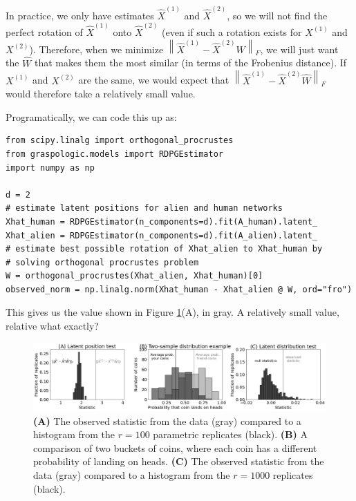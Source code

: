 In practice, we only have estimates $\hat X^{(1)}$ and $\hat X^{(2)}$, so we will not find the perfect rotation of $\hat X^{(1)}$ onto $\hat X^{(2)}$ (even if such a rotation exists for $X^{(1)}$ and $X^{(2)}$). Therefore, when we minimize $\left\|\hat X^{(1)} - \hat X^{(2)}W\right\|_F$, we will just want the $\hat W$ that makes them the most similar (in terms of the Frobenius distance). If $X^{(1)}$ and $X^{(2)}$ are the same, we would expect that $\left\|\hat X^{(1)} - \hat X^{(2)}\hat W\right\|_F$ would therefore take a relatively small value.

Programatically, we can code this up as:

\begin{lstlisting}[style=python]
from scipy.linalg import orthogonal_procrustes
from graspologic.models import RDPGEstimator
import numpy as np

d = 2
# estimate latent positions for alien and human networks
Xhat_human = RDPGEstimator(n_components=d).fit(A_human).latent_
Xhat_alien = RDPGEstimator(n_components=d).fit(A_alien).latent_
# estimate best possible rotation of Xhat_alien to Xhat_human by 
# solving orthogonal procrustes problem
W = orthogonal_procrustes(Xhat_alien, Xhat_human)[0]
observed_norm = np.linalg.norm(Xhat_human - Xhat_alien @ W, ord="fro")
\end{lstlisting}

This gives us the value shown in Figure \ref{fig:ch8:twosample:lpt}(A), in gray. A relatively small value, relative what exactly?

\begin{figure}
    \centering
    \includegraphics[width=\linewidth]{applications/ch8/Images/ts_ldt_ex.png}
    \caption[Latent position and latent distribution testing]{\textbf{(A)} The observed statistic from the data (gray) compared to a histogram from the $r=100$ parametric replicates (black). \textbf{(B)} A comparison of two buckets of coins, where each coin has a different probability of landing on heads. \textbf{(C)} The observed statistic from the data (gray) compared to a histogram from the $r=1000$ replicates (black).}
    \label{fig:ch8:twosample:lpt}
\end{figure}

